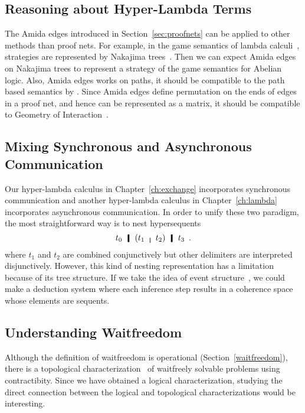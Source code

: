 
\subsection{Reasoning about Hyper-Lambda Terms}

The Amida edges introduced in Section~\ref{sec:proofnets} can be applied
to other methods than proof nets.
For example, in the game semantics of lambda calculi~\citep{untyped},
strategies are represented by Nakajima trees~\citep{nakajima1975}.
Then we can expect  Amida edges on Nakajima trees to represent a
strategy of the game semantics for Abelian logic.
Also, Amida edges works on paths, it should be compatible to the path
based semantics by \citet{danos-regnier}.
Since Amida edges define permutation on the ends of edges in a proof
net, and hence can be represented as a matrix, it should be compatible
to Geometry of Interaction~\citep{girard1989}.

\subsection{Mixing Synchronous and Asynchronous Communication}

Our hyper-lambda calculus in Chapter~\ref{ch:exchange} incorporates
synchronous communication and another hyper-lambda calculus in
Chapter~\ref{ch:lambda} incorporates asynchronous communication.
In order to unify these two paradigm, the most straightforward way is to
nest hypersequents
\[
 t_0\hmid (t_1 \whitemid t_2) \hmid t_3 \enspace.
\]
where $t_1$ and $t_2$ are combined conjunctively but other delimiters
are interpreted disjunctively.
However, this kind of nesting representation has a limitation because of
its tree structure.
If we take the idea of event structure~\citep{winskel1980},
we could make a deduction system where each inference step results in a
coherence space whose elements are sequents.

\subsection{Understanding Waitfreedom}

Although the definition of waitfreedom is operational
(Section~\ref{waitfreedom}),
there is a topological characterization~\citep{Herlihy99,Saks:1993vq} of
waitfreely solvable problems using contractibity.
Since we have obtained a logical characterization, studying the direct
connection between the logical and topological characterizations would
be interesting.

